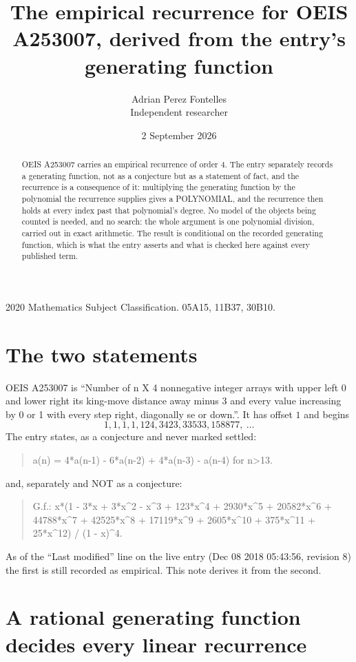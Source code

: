 \documentclass[11pt,a4paper]{article}
\title{The empirical recurrence for OEIS A253007, derived from the entry's generating function}
\author{Adrian Perez Fontelles\\ \small Independent researcher}
\date{2 September 2026}
\theoremstyle{plain}
\theoremstyle{definition}
\begin{document}
\maketitle

\begin{abstract}
OEIS A253007 carries an empirical recurrence of order $4$. The entry separately records a
generating function, not as a conjecture but as a statement of fact, and the recurrence is a
consequence of it: multiplying the generating function by the polynomial the recurrence
supplies gives a POLYNOMIAL, and the recurrence then holds at every index past that
polynomial's degree. No model of the objects being counted is needed, and no search: the
whole argument is one polynomial division, carried out in exact arithmetic. The result is
conditional on the recorded generating function, which is what the entry asserts and what is
checked here against every published term.
\end{abstract}

\noindent\small 2020 Mathematics Subject Classification. 05A15, 11B37, 30B10.\normalsize

\section{The two statements}

OEIS A253007 is ``Number of n X 4 nonnegative integer arrays with upper left 0 and lower right its king-move distance away minus 3 and every value increasing by 0 or 1 with every step right, diagonally se or down.''. It has offset $1$ and begins
\[
1, 1, 1, 1, 124, 3423, 33533, 158877,\ \dots
\]
The entry states, as a conjecture and never marked settled:
\begin{quote}
a(n) = 4*a(n-1) - 6*a(n-2) + 4*a(n-3) - a(n-4) for n>13.
\end{quote}
and, separately and NOT as a conjecture:
\begin{quote}
G.f.: x*(1 - 3*x + 3*x\^{}2 - x\^{}3 + 123*x\^{}4 + 2930*x\^{}5 + 20582*x\^{}6 + 44788*x\^{}7 + 42525*x\^{}8 + 17119*x\^{}9 + 2605*x\^{}10 + 375*x\^{}11 + 25*x\^{}12) / (1 - x)\^{}4.
\end{quote}
As of the ``Last modified'' line on the live entry (Dec 08 2018 05:43:56, revision 8) the first is still
recorded as empirical. This note derives it from the second.

\section{A rational generating function decides every linear recurrence}
\end{document}
